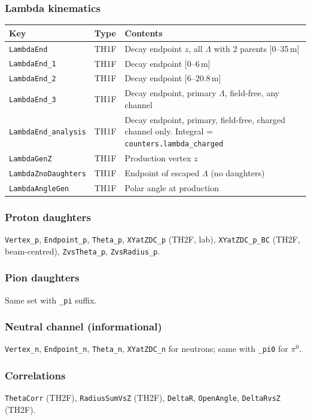\documentclass[11pt]{article}
\begin{document}
\subsubsection*{Lambda kinematics}
\begin{longtable}{p{4.5cm}lp{6cm}}
\toprule
Key & Type & Contents \\
\midrule
\texttt{LambdaEnd} & TH1F & Decay endpoint $z$, all $\Lambda$ with 2 parents [0--35\,m] \\
\texttt{LambdaEnd\_1} & TH1F & Decay endpoint [0--6\,m] \\
\texttt{LambdaEnd\_2} & TH1F & Decay endpoint [6--20.8\,m] \\
\texttt{LambdaEnd\_3} & TH1F & Decay endpoint, primary $\Lambda$, field-free, any channel \\
\texttt{LambdaEnd\_analysis} & TH1F & Decay endpoint, primary, field-free, charged channel only.
                                      Integral = \texttt{counters.lambda\_charged} \\
\texttt{LambdaGenZ} & TH1F & Production vertex $z$ \\
\texttt{LambdaZnoDaughters} & TH1F & Endpoint of escaped $\Lambda$ (no daughters) \\
\texttt{LambdaAngleGen} & TH1F & Polar angle at production \\
\bottomrule
\end{longtable}

\subsubsection*{Proton daughters}
\texttt{Vertex\_p}, \texttt{Endpoint\_p}, \texttt{Theta\_p},
\texttt{XYatZDC\_p} (TH2F, lab), \texttt{XYatZDC\_p\_BC} (TH2F, beam-centred),
\texttt{ZvsTheta\_p}, \texttt{ZvsRadius\_p}.

\subsubsection*{Pion daughters}
Same set with \texttt{\_pi} suffix.

\subsubsection*{Neutral channel (informational)}
\texttt{Vertex\_n}, \texttt{Endpoint\_n}, \texttt{Theta\_n},
\texttt{XYatZDC\_n} for neutrons; same with \texttt{\_pi0} for $\pi^0$.

\subsubsection*{Correlations}
\texttt{ThetaCorr} (TH2F), \texttt{RadiusSumVsZ} (TH2F),
\texttt{DeltaR}, \texttt{OpenAngle}, \texttt{DeltaRvsZ} (TH2F).
\end{document}
